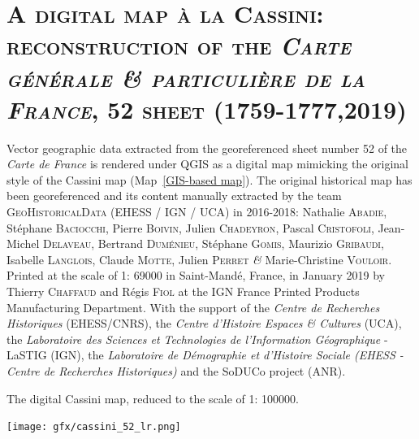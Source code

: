 \documentclass[portrait,a0]{sciposter}
\begin{document}
\begin{minipage}[b]{\textwidth}
\begin{multicols}{3}
\begin{center}
    \end{center}
  \end{multicols}
\end{minipage}
\begin{minipage}[b]{\textwidth}
  \section{\normalfont \textsc{A digital map à la Cassini: reconstruction of the \textit{Carte générale \& particulière de la France}, 52 sheet} (1759-1777,2019)}
  \small{Vector geographic data extracted from the georeferenced sheet number 52 of the \textit{Carte de France} is rendered under QGIS as a digital map mimicking the original style of the Cassini map (Map~\ref{GIS-based map}). The original historical map has been georeferenced and its content manually extracted by the team \textsc{GeoHistoricalData} (EHESS / IGN / UCA) in 2016-2018: Nathalie \textsc{Abadie}, Stéphane \textsc{Baciocchi}, Pierre \textsc{Boivin}, Julien \textsc{Chadeyron}, Pascal \textsc{Cristofoli}, Jean-Michel \textsc{Delaveau}, Bertrand \textsc{Duménieu}, Stéphane \textsc{Gomis}, Maurizio \textsc{Gribaudi}, Isabelle \textsc{Langlois}, Claude \textsc{Motte}, Julien \textsc{Perret} \textsc{\textit{\&}} Marie-Christine \textsc{Vouloir}. Printed at the scale of 1: \num{69000} in Saint-Mandé, France, in January 2019 by Thierry \textsc{Chaffaud} and Régis \textsc{Fiol} at the IGN France Printed Products Manufacturing Department. With the support of the \textit{Centre de Recherches Historiques} (EHESS/CNRS), the \textit{Centre d'Histoire \og Espaces \& Cultures \fg } (UCA), the \textit{Laboratoire des Sciences et Technologies de l'Information Géographique} - LaSTIG (IGN), the \textit{Laboratoire de Démographie et d'Histoire Sociale (EHESS - Centre de Recherches Historiques)} and the SoDUCo project (ANR).}
  \vspace{-0.5cm}
  \begin{center}
    \captionsetup{type=figure}
    \caption{The digital Cassini map, reduced to the scale of 1: \num{100000}.}%
    \label{GIS-based map}
     \vspace{-0.5cm}
    \texttt{[image: gfx/cassini\_52\_lr.png]}
    \vspace{0mm}

\end{center}
\end{minipage}
\end{document}
